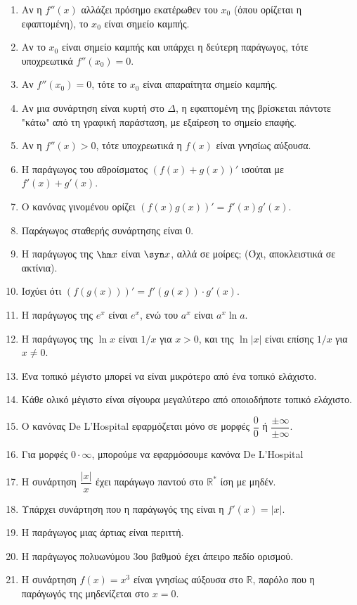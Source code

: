 \documentclass[11pt,a4paper]{article}
\newcommand{\eng}[1]{\selectlanguage{english}#1\selectlanguage{greek}}
\begin{document}
\begin{enumerate}[label=\textbf{2.\arabic*.}]
    \item Αν η $f''(x)$ αλλάζει πρόσημο εκατέρωθεν του $x_0$ (όπου ορίζεται η εφαπτομένη), το $x_0$ είναι σημείο καμπής.
    \item Αν το $x_0$ είναι σημείο καμπής και υπάρχει η δεύτερη παράγωγος, τότε υποχρεωτικά $f''(x_0) = 0$.
    \item Αν $f''(x_0) = 0$, τότε το $x_0$ είναι απαραίτητα σημείο καμπής.
    \item Αν μια συνάρτηση είναι κυρτή στο $\Delta$, η εφαπτομένη της βρίσκεται πάντοτε "κάτω" από τη γραφική παράσταση, με εξαίρεση το σημείο επαφής.
    \item Αν η $f''(x) > 0$, τότε υποχρεωτικά η $f(x)$ είναι γνησίως αύξουσα.
    \item Η παράγωγος του αθροίσματος $(f(x)+g(x))'$ ισούται με $f'(x)+g'(x)$.
    \item O κανόνας γινομένου ορίζει $(f(x)g(x))' = f'(x)g'(x)$.
    \item Παράγωγος σταθερής συνάρτησης είναι 0.
    \item Η παράγωγος της $\hm x$ είναι $\syn x$, αλλά σε μοίρες; (Όχι, αποκλειστικά σε ακτίνια).
    \item Ισχύει ότι $(f(g(x)))' = f'(g(x)) \cdot g'(x)$.
    \item Η παράγωγος της $e^x$ είναι $e^x$, ενώ του $a^x$ είναι $a^x \ln a$.
    \item Η παράγωγος της $\ln x$ είναι $1/x$ για $x>0$, και της $\ln |x|$ είναι επίσης $1/x$ για $x \ne 0$.
    \item Ένα τοπικό μέγιστο μπορεί να είναι μικρότερο από ένα τοπικό ελάχιστο.
    \item Κάθε ολικό μέγιστο είναι σίγουρα μεγαλύτερο από οποιοδήποτε τοπικό ελάχιστο.
    \item Ο κανόνας \eng{De L'Hospital} εφαρμόζεται μόνο σε μορφές $\dfrac{0}{0}$ ή $\dfrac{\pm \infty}{\pm \infty}$.
    \item Για μορφές $0 \cdot \infty$, μπορούμε να εφαρμόσουμε κανόνα \eng{De L'Hospital}
    \item Η συνάρτηση $\dfrac{|x|}{x}$ έχει παράγωγο παντού στο $\mathbb{R}^*$ ίση με μηδέν.
    \item Υπάρχει συνάρτηση που η παράγωγός της είναι η $f'(x) = |x|$.
    \item Η παράγωγος μιας άρτιας είναι περιττή.
    \item Η παράγωγος πολυωνύμου 3ου βαθμού έχει άπειρο πεδίο ορισμού.
    \item Η συνάρτηση $f(x) = x^3$ είναι γνησίως αύξουσα στο $\mathbb{R}$, παρόλο που η παράγωγός της μηδενίζεται στο $x=0$.

\end{enumerate}
\end{document}
